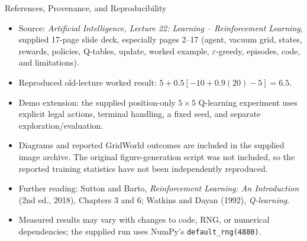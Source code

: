 \documentclass[aspectratio=169,10pt]{beamer}
\begin{document}
\begin{frame}{References, Provenance, and Reproducibility}
\footnotesize
\begin{itemize}
\item Source: \emph{Artificial Intelligence, Lecture 22: Learning -- Reinforcement Learning}, supplied 17-page slide deck, especially pages 2--17 (agent, vacuum grid, states, rewards, policies, Q-tables, update, worked example, $\varepsilon$-greedy, episodes, code, and limitations).
\item Reproduced old-lecture worked result: $5+0.5[-10+0.9(20)-5]=6.5$.
\item Demo extension: the supplied position-only $5\times5$ Q-learning experiment uses explicit legal actions, terminal handling, a fixed seed, and separate exploration/evaluation.
\item Diagrams and reported GridWorld outcomes are included in the supplied image archive. The original figure-generation script was not included, so the reported training statistics have not been independently reproduced.
\item Further reading: Sutton and Barto, \emph{Reinforcement Learning: An Introduction} (2nd ed., 2018), Chapters 3 and 6; Watkins and Dayan (1992), \emph{Q-learning}.
\item Measured results may vary with changes to code, RNG, or numerical dependencies; the supplied run uses NumPy's \texttt{default\_rng(4880)}.
\end{itemize}
\end{frame}
\end{document}
